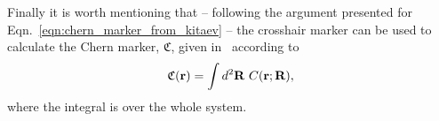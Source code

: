 Finally it is worth mentioning that -- following the argument presented for Eqn.~\ref{eqn:chern_marker_from_kitaev} -- the crosshair marker can be used to calculate the Chern marker, $\mathfrak{C}$, given in~\cite{bianco_mapping_2011} according to
\begin{align}
    \mathfrak{C}(\textbf r) = \int d^2 \textbf R\ C(\textbf r;  \textbf R),
\end{align}
where the integral is over the whole system. 


